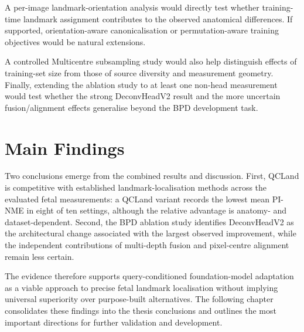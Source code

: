 A per-image landmark-orientation analysis would directly test whether
training-time landmark assignment contributes to the observed
anatomical differences. If supported, orientation-aware
canonicalisation or permutation-aware training objectives would be
natural extensions.

A controlled Multicentre subsampling study would also help distinguish
effects of training-set size from those of source diversity and
measurement geometry. Finally, extending the ablation study to at
least one non-head measurement would test whether the strong
DeconvHeadV2 result and the more uncertain fusion/alignment effects
generalise beyond the BPD development task.



\section{Main Findings}
\label{sec:results-summary}
\label{sec:results-comparative-summary}

Two conclusions emerge from the combined results and discussion.
First, QCLand is competitive with established landmark-localisation
methods across the evaluated fetal measurements: a QCLand variant
records the lowest mean PI-NME in eight of ten settings, although the
relative advantage is anatomy- and dataset-dependent. Second, the BPD
ablation study identifies DeconvHeadV2 as the architectural change
associated with the largest observed improvement, while the
independent contributions of multi-depth fusion and pixel-centre
alignment remain less certain.

The evidence therefore supports query-conditioned foundation-model
adaptation as a viable approach to precise fetal landmark localisation
without implying universal superiority over purpose-built
alternatives. The following chapter consolidates these findings into
the thesis conclusions and outlines the most important directions for
further validation and development.
